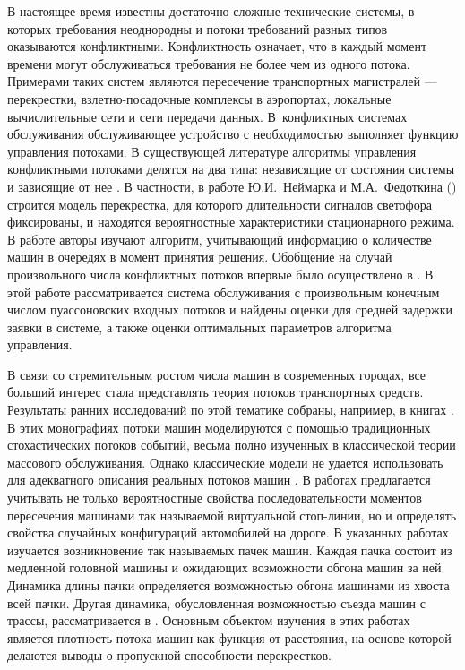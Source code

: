 \documentclass[a4paper,12pt,russian]{extarticle}
\begin{document}
В настоящее время известны достаточно сложные технические системы, в которых требования неоднородны и потоки требований разных типов оказываются конфликтными. Конфликтность означает, что в каждый момент времени могут обслуживаться требования не более чем из одного потока. Примерами таких систем являются пересечение транспортных магистралей --- перекрестки, взлетно-посадочные комплексы в аэропортах, локальные вычислительные сети и сети передачи данных. В~конфликтных системах обслуживания обслуживающее устройство с необходимостью выполняет функцию управления потоками. В существующей литературе алгоритмы управления конфликтными потоками делятся на два типа: независящие от состояния системы \cite{Darroch:1964,Neymark:Fedotkin:1967} и зависящие от нее \cite{Neymark:Fedotkin:1968, Fedotkin:1976, Ferguson:1985, Takagi:1985}. В частности, в работе Ю.И.~Неймарка и М.А.~Федоткина (\cite{Neymark:Fedotkin:1967}) строится модель перекрестка, для которого длительности сигналов светофора фиксированы, и находятся вероятностные характеристики стационарного режима. В работе \cite{Neymark:Fedotkin:1968} авторы изучают алгоритм, учитывающий информацию о количестве машин в очередях в момент принятия решения. Обобщение на случай произвольного числа конфликтных потоков впервые было осуществлено в \cite{Yakushev:1990}. В этой работе рассматривается система обслуживания с произвольным конечным числом пуассоновских входных потоков и найдены оценки для средней задержки заявки в системе, а также оценки оптимальных параметров алгоритма управления. 

В связи со стремительным ростом числа машин в современных городах, все больший интерес стала представлять теория потоков транспортных средств. Результаты ранних исследований по этой тематике собраны, например, в книгах \cite{Haight:1963, Drew:1968, Inose:1975}. В этих монографиях потоки машин моделируются с помощью традиционных стохастических потоков событий, весьма полно изученных в классической теории массового обслуживания. Однако классические модели не удается использовать для адекватного описания реальных потоков машин \cite{Bartlet:1963}. В работах
\cite{Fedotkin:2009,Fedotkin:Kudryavcev:Rachinskaya:2010, Rachinskaya:Fedotkin:2011:1,Rachinskaya:Fedotkin:2011:2, Fedotkin:Kudryavcev:Rachinskaya:2011, Rachinskaya:Fedotkin:2012, Rachinskaya:Fedotkin:2013, Rachinskaya:Fedotkin:2014} предлагается учитывать не только вероятностные свойства последовательности моментов пересечения машинами так называемой виртуальной стоп-линии, но и определять свойства случайных конфигураций автомобилей на дороге. В указанных работах изучается возникновение так называемых пачек машин. Каждая пачка состоит из медленной головной машины и ожидающих возможности обгона машин за ней. Динамика длины пачки определяется возможностью обгона машинами из хвоста всей пачки. Другая динамика, обусловленная возможностью съезда машин с трассы, рассматривается в \cite{Afanasyeva:Bulinskaya:2013:1,Afanasyeva:Bulinskaya:2010,Afanasyeva:Bulinskaya:2013:2}. Основным объектом изучения в этих работах является плотность потока машин как функция от расстояния, на основе которой делаются выводы о пропускной способности перекрестков.
\end{document}
